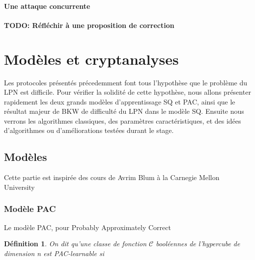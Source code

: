 \documentclass{article}		%
\newtheorem{defi}{Définition}
\theoremstyle{definition}
\theoremstyle{plain}
\begin{document}
\paragraph{Une attaque concurrente}
\paragraph{TODO: Réfléchir à une proposition de correction}

\section{Modèles et cryptanalyses}
Les protocoles présentés précedemment font tous l'hypothèse que le
problème du LPN est difficile. Pour vérifier la solidité de cette
hypothèse,   nous allons
présenter rapidement les deux grands modèles d'apprentissage SQ et PAC, ainsi que le
résultat majeur de BKW de difficulté du LPN dans le modèle SQ. Ensuite
nous verrons les algorithmes classiques, des paramètres caractéristiques,
et des idées d'algorithmes ou d'améliorations testées durant le stage.

\subsection{Modèles}
Cette partie est inspirée des cours de Avrim
Blum à la Carnegie Mellon University
\subsubsection{Modèle PAC}
Le modèle PAC, pour Probably Approximately Correct


\begin{defi}
On dit qu'une classe de fonction $\mathcal{C}$ booléennes de l'hypercube
de dimension n est PAC-learnable si
\end{defi}
\end{document}
